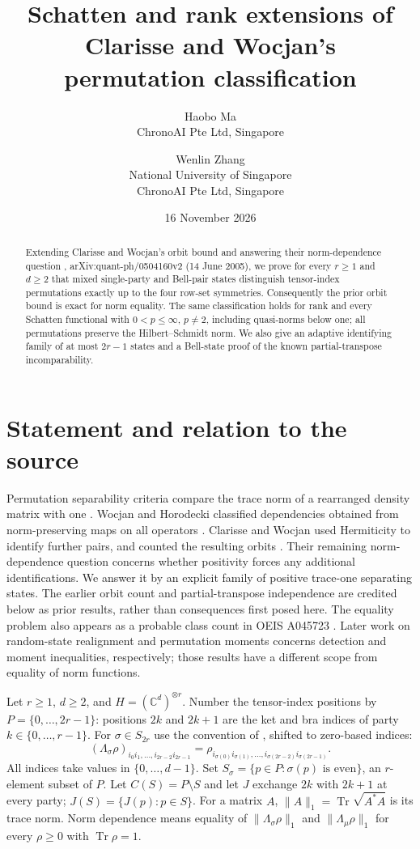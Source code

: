 \documentclass[11pt]{article}
\title{Schatten and rank extensions of Clarisse and Wocjan's\\permutation classification}
\author{Haobo Ma\\\small ChronoAI Pte Ltd, Singapore
\and Wenlin Zhang\\\small National University of Singapore\\\small ChronoAI Pte Ltd, Singapore}
\date{16 November 2026}
\newcommand{\tr}{\operatorname{Tr}}
\newcommand{\norm}[1]{\lVert #1\rVert}
\begin{document}
\maketitle
\begin{abstract}
Extending Clarisse and Wocjan's orbit bound and answering their
norm-dependence question \cite[Theorem~3, p.~3, equation~(2);
Section~V, p.~6; Definition~1, p.~2]{CW},
arXiv:quant-ph/0504160v2 (14 June 2005), we prove for every $r\geq1$
and $d\geq2$ that mixed single-party and Bell-pair states distinguish
tensor-index permutations exactly up to the four row-set symmetries.
Consequently the prior orbit bound is exact for norm equality.
The same classification holds for rank and every Schatten functional
with $0<p\leq\infty$, $p\ne2$, including quasi-norms below one;
all permutations preserve the Hilbert--Schmidt norm.
We also give an adaptive identifying family of at most $2r-1$ states
and a Bell-state proof of the known partial-transpose incomparability.
\end{abstract}

\section{Statement and relation to the source}

Permutation separability criteria compare the trace norm of a rearranged
density matrix with one \cite{HHH}. Wocjan and Horodecki classified
dependencies obtained from norm-preserving maps on all operators
\cite[Lemmas 1--2]{WH}. Clarisse and Wocjan used Hermiticity to identify
further pairs, and counted the resulting orbits
\cite[Theorem 3]{CW}. Their remaining norm-dependence question concerns
whether positivity forces any additional identifications. We answer it
by an explicit family of positive trace-one separating states.
The earlier orbit count and partial-transpose independence are credited
below as prior results, rather than consequences first posed here.
The equality problem also appears as a probable class count in
OEIS A045723 \cite{OEIS}. Later work on random-state realignment
\cite[Section~1.1 and Theorem~1.1]{AN} and permutation moments
\cite{Liu} concerns detection and moment inequalities, respectively;
those results have a different scope from equality of norm functions.

Let $r\geq1$, $d\geq2$, and $H=(\mathbb C^d)^{\otimes r}$.
Number the tensor-index positions by
$P=\{0,\ldots,2r-1\}$: positions $2k$ and $2k+1$ are the ket and bra
indices of party $k\in\{0,\ldots,r-1\}$. For $\sigma\in S_{2r}$ use
the convention of \cite[Section II]{CW}, shifted to zero-based indices:
\[
 (\Lambda_\sigma\rho)_{i_0i_1,\ldots,i_{2r-2}i_{2r-1}}
 =\rho_{i_{\sigma(0)}i_{\sigma(1)},\ldots,
              i_{\sigma(2r-2)}i_{\sigma(2r-1)}}.
\]
All indices take values in $\{0,\ldots,d-1\}$.
Set $S_\sigma=\{p\in P:\sigma(p)\text{ is even}\}$, an $r$-element
subset of $P$. Let $C(S)=P\setminus S$ and let $J$ exchange $2k$ with
$2k+1$ at every party; $J(S)=\{J(p):p\in S\}$.
For a matrix $A$, $\norm{A}_1=\tr\sqrt{A^*A}$ is its trace norm.
Norm dependence means equality of $\norm{\Lambda_\sigma\rho}_1$ and
$\norm{\Lambda_\mu\rho}_1$ for every $\rho\geq0$ with $\tr\rho=1$.
\end{document}
